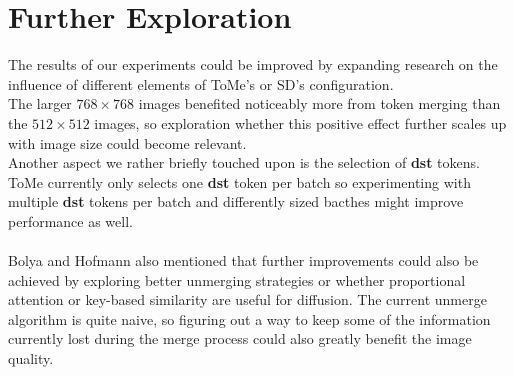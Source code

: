 \section{Further Exploration}
The results of our experiments could be improved by expanding research on the influence of different elements of ToMe's or SD's configuration.\\ 
The larger $768 \times 768$ images benefited noticeably more from token merging than the $512 \times 512$ images, so exploration whether this positive effect further scales up with image size could become relevant.\\
Another aspect we rather briefly touched upon is the selection of \textbf{dst} tokens. ToMe currently only selects one \textbf{dst} token per batch so experimenting with multiple \textbf{dst} tokens per batch and differently sized bacthes might improve performance as well.\\ 
\\
Bolya and Hofmann also mentioned that further improvements could also be achieved by exploring better unmerging strategies or whether proportional attention or key-based similarity are useful for diffusion.
The current unmerge algorithm is quite naive, so figuring out a way to keep some of the information currently lost during the merge process could also greatly benefit the image quality.



